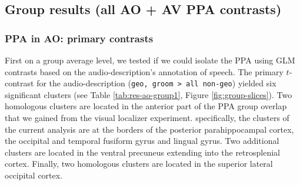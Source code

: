 \documentclass[english]{article}
\begin{document}

\subsection{Group results (all AO + AV PPA contrasts)}






\subsubsection{PPA in AO: primary contrasts}

First on a group average level, we tested if we could isolate the PPA using GLM
contrasts based on the audio-description's annotation of speech.
The primary $t$-contrast for the audio-description (\texttt{geo, groom > all
non-geo}) yielded six significant clusters (see Table \ref{tab:res-ao-group1},
Figure \ref{fig:group-slices}).
Two homologous clusters are located in the anterior part of the PPA group
overlap that we gained from the visual localizer experiment.
specifically, the clusters of the current analysis are at the borders of the
posterior parahippocampal cortex, the occipital and temporal fusiform gyrus and
lingual gyrus.
Two additional clusters are located in the ventral precuneus extending into the
retrosplenial cortex.
Finally, two homologous clusters are located in the superior lateral occipital
cortex.
\end{document}
